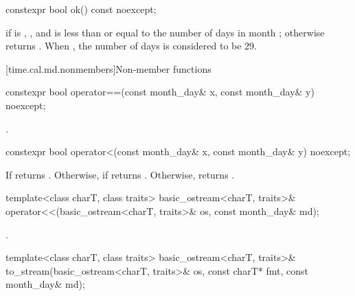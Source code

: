%
\begin{itemdecl}
constexpr bool ok() const noexcept;
\end{itemdecl}

\begin{itemdescr}
\pnum
\returns
{} if
 is ,
, and
 is less than or equal to the number of days in month ;
otherwise returns .
When ,
the number of days is considered to be 29.
\end{itemdescr}

[time.cal.md.nonmembers]{Non-member functions}

%
\begin{itemdecl}
constexpr bool operator==(const month_day& x, const month_day& y) noexcept;
\end{itemdecl}

\begin{itemdescr}
\pnum
\returns {}.
\end{itemdescr}

%
\begin{itemdecl}
constexpr bool operator<(const month_day& x, const month_day& y) noexcept;
\end{itemdecl}

\begin{itemdescr}
\pnum
\returns
If  returns .
Otherwise, if  returns .
Otherwise, returns .
\end{itemdescr}

%
\begin{itemdecl}
template<class charT, class traits>
  basic_ostream<charT, traits>&
    operator<<(basic_ostream<charT, traits>& os, const month_day& md);
\end{itemdecl}

\begin{itemdescr}
\pnum
\returns {}.
\end{itemdescr}

%
\begin{itemdecl}
template<class charT, class traits>
  basic_ostream<charT, traits>&
    to_stream(basic_ostream<charT, traits>& os, const charT* fmt, const month_day& md);
\end{itemdecl}

